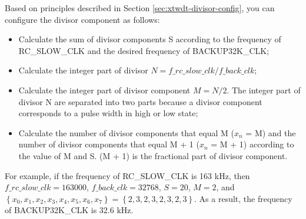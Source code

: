 \documentclass[main\_\_EN.tex]{subfiles}
\begin{document}
Based on principles described in Section \ref{sec:xtwdt-divisor-config}, you can configure the divisor component as follows:
\begin{itemize}
    \item Calculate the sum of divisor components S according to the frequency of RC\_SLOW\_CLK and the desired frequency of BACKUP32K\_CLK;
    \item Calculate the integer part of divisor \begin{math}N = f\_rc\_slow\_clk / f\_back\_clk\end{math};
    \item Calculate the integer part of divisor component \begin{math}M = N/2\end{math}. The integer part of divisor N are separated into two parts because a divisor component corresponds to a pulse width in high or low state;
    \item Calculate the number of divisor components that equal M (\begin{math}x_n\end{math} = M) and the number of divisor components that equal M + 1 (\begin{math}x_n\end{math} = M + 1)  according to the value of M and S. (M + 1) is the fractional part of divisor component.


\end{itemize}

For example, if the frequency of RC\_SLOW\_CLK is 163 kHz, then \begin{math}f\_rc\_slow\_clk = 163000\end{math}, \begin{math}f\_back\_clk = 32768\end{math}, \begin{math}S = 20\end{math}, \begin{math}M = 2 \end{math}, and \begin{math} \left\{x_0, x_1, x_2, x_3, x_4, x_5, x_6, x_7\right\} = \left\{2, 3, 2, 3, 2, 3, 2, 3\right\}\end{math}. As a result, the frequency of BACKUP32K\_CLK is 32.6 kHz.
\end{document}
